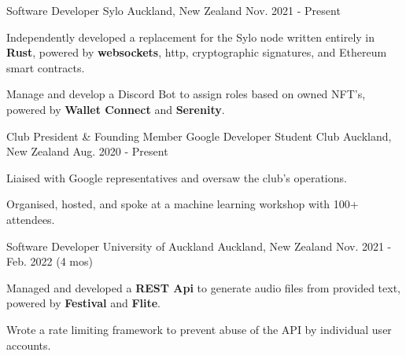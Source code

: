 
\begin{cventries}

  \cventry
    {Software Developer} %
    {Sylo} %
    {Auckland, New Zealand} %
    {Nov. 2021 - Present} %
    {
      \begin{cvitems} %
        \item {Independently developed a replacement for the Sylo node written entirely in \textbf{Rust}, powered by \textbf{websockets}, http, cryptographic signatures, and Ethereum smart contracts.}
        \item {Manage and develop a Discord Bot to assign roles based on owned NFT's, powered by \textbf{Wallet Connect} and \textbf{Serenity}.}
      \end{cvitems}
    }

  \cventry
    {Club President \& Founding Member} %
    {Google Developer Student Club} %
    {Auckland, New Zealand} %
    {Aug. 2020 - Present} %
    {
      \begin{cvitems} %
        \item {Liaised with Google representatives and oversaw the club's operations.}
        \item {Organised, hosted, and spoke at a machine learning workshop with 100+ attendees.}
      \end{cvitems}
    }

  \cventry
    {Software Developer} %
    {University of Auckland} %
    {Auckland, New Zealand} %
    {Nov. 2021 - Feb. 2022 (4 mos)} %
    {
      \begin{cvitems} %
        \item {Managed and developed a \textbf{REST Api} to generate audio files from provided text, powered by \textbf{Festival} and \textbf{Flite}.}
        \item {Wrote a rate limiting framework to prevent abuse of the API by individual user accounts.}
      \end{cvitems}
    }



\end{cventries}
